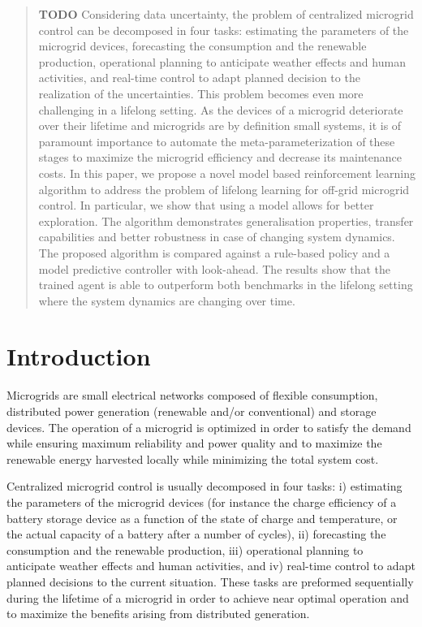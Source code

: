 \documentclass{article}
\begin{document}
\printAffiliationsAndNotice{} %

\begin{abstract}
	\textbf{TODO} 
	Considering data uncertainty, the problem of centralized microgrid control can be decomposed in four tasks: estimating the parameters of the microgrid devices, forecasting the consumption and the renewable production, operational planning to anticipate weather effects and human activities, and real-time control to adapt planned decision to the realization of the uncertainties. This problem becomes even more challenging in a lifelong setting. As the devices of a microgrid deteriorate over their lifetime and microgrids are by definition small systems, it is of paramount importance to automate the meta-parameterization of these stages to maximize the microgrid efficiency and decrease its maintenance costs. In this paper, we propose a novel model based reinforcement learning algorithm to address the problem of lifelong learning for off-grid microgrid control. In particular, we show that using a model allows for better exploration. The algorithm demonstrates generalisation properties, transfer capabilities and better robustness in case of changing system dynamics. The proposed algorithm is compared against a rule-based policy and a model predictive controller with look-ahead. The results show that the trained agent is able to outperform both benchmarks in the lifelong setting where the system dynamics are changing over time.
\end{abstract}

\section{ Introduction} \label{sec: Introduction}
	Microgrids are small electrical networks composed of flexible consumption, distributed power generation (renewable and/or conventional) and storage devices. The operation of a microgrid is optimized in order to satisfy the demand while ensuring maximum reliability and power quality and to maximize the renewable energy harvested locally while minimizing the total system cost.

	Centralized microgrid control is usually decomposed in four tasks: i) estimating the parameters of the microgrid devices (for instance the charge efficiency of a battery storage device as a function of the state of charge and temperature, or the actual capacity of a battery after a number of cycles), ii) forecasting the consumption and the renewable production, iii) operational planning to anticipate weather effects and human activities, and iv) real-time control to adapt planned decisions to the current situation. These tasks are preformed sequentially during the lifetime of a microgrid in order to achieve near optimal operation and to maximize the benefits arising from distributed generation. 
\end{document}
